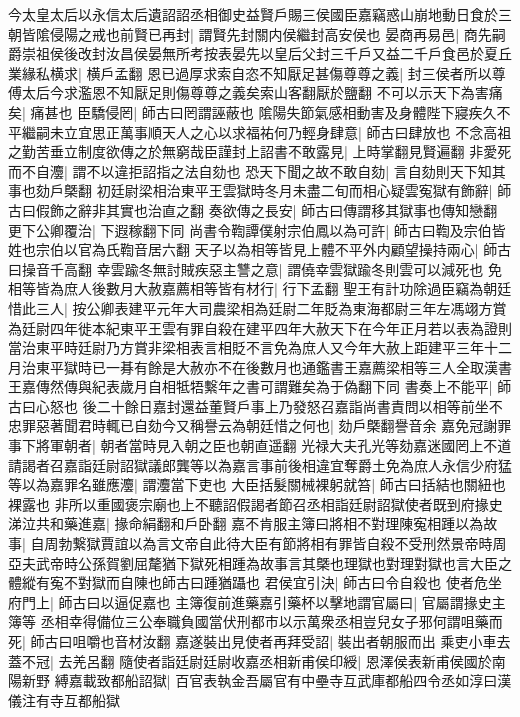 今太皇太后以永信太后遺詔詔丞相御史益賢戶賜三侯國臣嘉竊惑山崩地動日食於三朝皆隂侵陽之戒也前賢已再封|{
	謂賢先封關内侯繼封高安侯也}
晏商再易邑|{
	商先嗣爵崇祖侯後改封汝昌侯晏無所考按表晏先以皇后父封三千戶又益二千戶食邑於夏丘}
業緣私横求|{
	横戶孟翻}
恩已過厚求索自恣不知厭足甚傷尊尊之義|{
	封三侯者所以尊傅太后今求濫恩不知厭足則傷尊尊之義矣索山客翻厭於鹽翻}
不可以示天下為害痛矣|{
	痛甚也}
臣驕侵罔|{
	師古曰罔謂誣蔽也}
隂陽失節氣感相動害及身體陛下寢疾久不平繼嗣未立宜思正萬事順天人之心以求福祐何乃輕身肆意|{
	師古曰肆放也}
不念高祖之勤苦垂立制度欲傳之於無窮哉臣謹封上詔書不敢露見|{
	上時掌翻見賢遍翻}
非愛死而不自灋|{
	謂不以違拒詔指之法自劾也}
恐天下聞之故不敢自劾|{
	言自劾則天下知其事也劾戶槩翻}
初廷尉梁相治東平王雲獄時冬月未盡二旬而相心疑雲寃獄有飾辭|{
	師古曰假飾之辭非其實也治直之翻}
奏欲傳之長安|{
	師古曰傳謂移其獄事也傳知戀翻}
更下公卿覆治|{
	下遐稼翻下同}
尚書令鞫譚僕射宗伯鳳以為可許|{
	師古曰鞫及宗伯皆姓也宗伯以官為氏鞫音居六翻}
天子以為相等皆見上體不平外内顧望操持兩心|{
	師古曰操音千高翻}
幸雲踰冬無討賊疾惡主讐之意|{
	謂僥幸雲獄踰冬則雲可以減死也}
免相等皆為庶人後數月大赦嘉薦相等皆有材行|{
	行下孟翻}
聖王有計功除過臣竊為朝廷惜此三人|{
	按公卿表建平元年大司農梁相為廷尉二年貶為東海都尉三年左馮翊方賞為廷尉四年徙本紀東平王雲有罪自殺在建平四年大赦天下在今年正月若以表為證則當治東平時廷尉乃方賞非梁相表言相貶不言免為庶人又今年大赦上距建平三年十二月治東平獄時已一朞有餘是大赦亦不在後數月也通鑑書王嘉薦梁相等三人全取漢書王嘉傳然傳與紀表歲月自相牴牾繫年之書可謂難矣為于偽翻下同}
書奏上不能平|{
	師古曰心怒也}
後二十餘日嘉封還益董賢戶事上乃發怒召嘉詣尚書責問以相等前坐不忠罪惡著聞君時輒已自劾今又稱譽云為朝廷惜之何也|{
	劾戶槩翻譽音余}
嘉免冠謝罪事下將軍朝者|{
	朝者當時見入朝之臣也朝直遥翻}
光禄大夫孔光等劾嘉迷國罔上不道請謁者召嘉詣廷尉詔獄議郎龔等以為嘉言事前後相違宜奪爵土免為庶人永信少府猛等以為嘉罪名雖應灋|{
	謂灋當下吏也}
大臣括髮關械裸躬就笞|{
	師古曰括結也關紐也裸露也}
非所以重國褒宗廟也上不聽詔假謁者節召丞相詣廷尉詔獄使者既到府掾史涕泣共和藥進嘉|{
	掾命絹翻和戶卧翻}
嘉不肯服主簿曰將相不對理陳寃相踵以為故事|{
	自周勃繋獄賈誼以為言文帝自此待大臣有節將相有罪皆自殺不受刑然景帝時周亞夫武帝時公孫賀劉屈氂猶下獄死相踵為故事言其槩也理獄也對理對獄也言大臣之體縱有寃不對獄而自陳也師古曰踵猶躡也}
君侯宜引決|{
	師古曰令自殺也}
使者危坐府門上|{
	師古曰以逼促嘉也}
主簿復前進藥嘉引藥杯以擊地謂官屬曰|{
	官屬謂掾史主簿等}
丞相幸得備位三公奉職負國當伏刑都市以示萬衆丞相豈兒女子邪何謂咀藥而死|{
	師古曰咀嚼也音材汝翻}
嘉遂裝出見使者再拜受詔|{
	裝出者朝服而出}
乘吏小車去蓋不冠|{
	去羌呂翻}
隨使者詣廷尉廷尉收嘉丞相新甫侯印綬|{
	恩澤侯表新甫侯國於南陽新野}
縛嘉載致都船詔獄|{
	百官表執金吾屬官有中壘寺互武庫都船四令丞如淳曰漢儀注有寺互都船獄}
